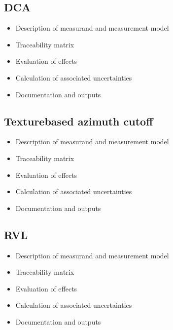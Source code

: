 \documentclass[a4paper,10pt,english]{sphinxmanual}
\begin{document}
\subsection{DCA}
\label{\detokenize{04_uncertainty_analysis:dca}}\begin{itemize}
\item {} 
\sphinxAtStartPar
Description of measurand and measurement model

\item {} 
\sphinxAtStartPar
Traceability matrix

\item {} 
\sphinxAtStartPar
Evaluation of effects

\item {} 
\sphinxAtStartPar
Calculation of associated uncertainties

\item {} 
\sphinxAtStartPar
Documentation and outputs

\end{itemize}


\subsection{Texture\sphinxhyphen{}based azimuth cutoff}
\label{\detokenize{04_uncertainty_analysis:texture-based-azimuth-cutoff}}\begin{itemize}
\item {} 
\sphinxAtStartPar
Description of measurand and measurement model

\item {} 
\sphinxAtStartPar
Traceability matrix

\item {} 
\sphinxAtStartPar
Evaluation of effects

\item {} 
\sphinxAtStartPar
Calculation of associated uncertainties

\item {} 
\sphinxAtStartPar
Documentation and outputs

\end{itemize}


\subsection{RVL}
\label{\detokenize{04_uncertainty_analysis:rvl}}\begin{itemize}
\item {} 
\sphinxAtStartPar
Description of measurand and measurement model

\item {} 
\sphinxAtStartPar
Traceability matrix

\item {} 
\sphinxAtStartPar
Evaluation of effects

\item {} 
\sphinxAtStartPar
Calculation of associated uncertainties

\item {} 
\sphinxAtStartPar
Documentation and outputs

\end{itemize}
\end{document}
